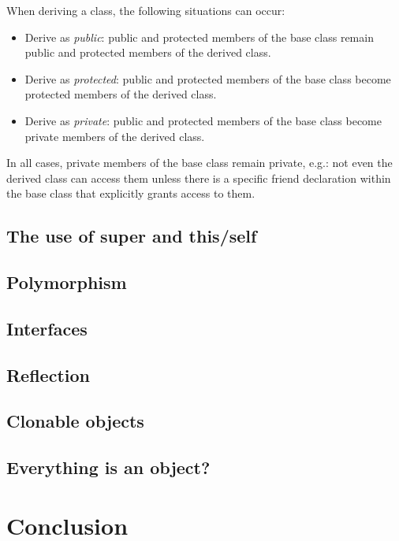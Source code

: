\documentclass[10pt,a4paper,twocolumn]{article}
\begin{document}
When deriving a class, the following situations can occur:
\begin{itemize}
\item Derive as \textit{public}: public and protected members of the base class remain public and protected members of the derived class.
\item Derive as \textit{protected}: public and protected members of the base class become protected members of the derived class.
\item Derive as \textit{private}: public and protected members of the base class become private members of the derived class.
\end{itemize}
In all cases, private members of the base class remain private, e.g.: not even the derived class can access them unless there is a specific friend declaration within the base class that explicitly grants access to them.

\subsection{The use of super and this/self}

\subsection{Polymorphism}

\subsection{Interfaces}

\subsection{Reflection}

\subsection{Clonable objects}

\subsection{Everything is an object?}

\section{Conclusion}
\end{document}
